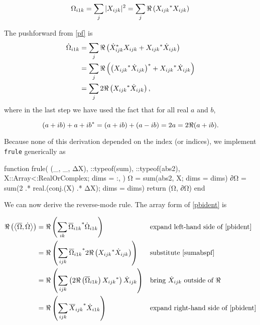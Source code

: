 \documentclass[../main.tex]{subfiles}
\begin{document}
\begin{refsection}
\[\Omega_{i1k} = \sum_{j} |X_{ijk}|^2
             = \sum_{j} \Re \left(
                  { X_{ijk} }^* X_{ijk}
               \right)\]

The pushforward from \eqref{pf} is
\begin{align}
\dot{\Omega}_{i1k}
    &= \sum_j \Re\left(
           { \dot{X}_{ijk} }^* X_{ijk} +
           { X_{ijk} }^* \dot{X}_{ijk} \right) \nonumber\\
    &= \sum_j \Re\left(
            {\left(
                { X_{ijk} }^* \dot{X}_{ijk}
            \right)}^* +
            {X_{ijk}}^* \dot{X}_{ijk}
       \right) \nonumber\\
    &= \sum_j 2 \Re\left(
           { X_{ijk} }^* \dot{X}_{ijk}
       \right), \label{sumabspf}
\end{align}
where in the last step we have used the fact that for all real $a$ and $b$,

\[(a + i b) + {a + i b}^*
    = (a + i b) + (a - i b)
    = 2 a
    = 2 \Re (a + i b).\]

Because none of this derivation depended on the index (or indices), we implement \texttt{frule} generically as
\begin{juliacode}
function frule(
    (_, _, ΔX),
    ::typeof(sum),
    ::typeof(abs2),
    X::Array{<:RealOrComplex};
    dims = :,
)
    Ω = sum(abs2, X; dims = dims)
    ∂Ω = sum(2 .* real.(conj.(X) .* ΔX); dims = dims)
    return (Ω, ∂Ω)
end
\end{juliacode}
We can now derive the reverse-mode rule.
The array form of \eqref{pbident} is

\begingroup
\allowdisplaybreaks
\begin{align*}
\Re\left( \left\langle  \overline{\Omega} ,  \dot{\Omega}  \right\rangle \right)
    &= \Re \left( \sum_{ik}
           { \overline{\Omega}_{i1k} }^* \dot{\Omega}_{i1k}
       \right)
           && \text{expand left-hand side of } \eqref{pbident}\\
    &= \Re \left(\sum_{ijk}
           { \overline{\Omega}_{i1k} }^*
           2 \Re\left(
               { X_{ijk} }^* \dot{X}_{ijk}
           \right)
       \right)
           && \text{substitute } \eqref{sumabspf}\\
    &= \Re \left( \sum_{ijk}
           \left(
               2 \Re \left( \overline{\Omega}_{i1k} \right)
               { X_{ijk} }^*
           \right) \dot{X}_{ijk}
       \right)
           && \text{bring } \dot{X}_{ijk} \text{ outside of } \Re\\
    &= \Re \left( \sum_{ijk}
           { \overline{X}_{ijk} }^* \dot{X}_{i1k}
       \right)
           && \text{expand right-hand side of } \eqref{pbident}
\end{align*}
\endgroup


\end{refsection}
\end{document}
